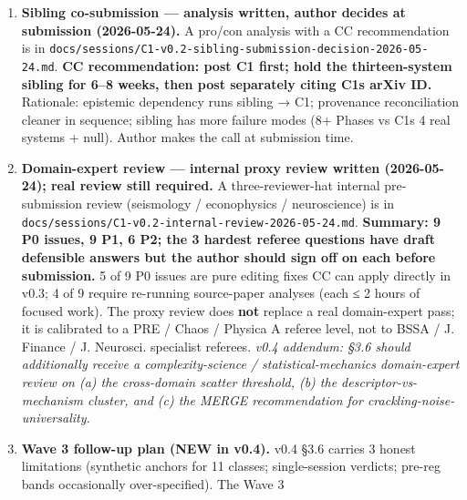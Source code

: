\documentclass[
  11pt]{article}
\begin{document}
\begin{enumerate}
  numerical one, (iii) reframing the §6.1 qualification in terms of
  which criterion is decisive for an SOC class claim (joint signature vs
  single Vuong test), (iv) adding an explicit falsifier statement for
  Phase 2\textquotesingle s SOC verdict, and (v) adding the historical
  lognormal-vs-power-law econophysics literature context. An
  econophysics-savvy domain expert should still review the framing
  before submission. A separate decision about whether to issue a
  published correction note for the standalone arxiv-02 paper is the
  author\textquotesingle s editorial call.
\item
  \textbf{Sibling co-submission --- analysis written, author decides at
  submission (2026-05-24).} A pro/con analysis with a CC recommendation
  is in
  \texttt{docs/sessions/C1-v0.2-sibling-submission-decision-2026-05-24.md}.
  \textbf{CC recommendation: post C1 first; hold the thirteen-system
  sibling for 6--8 weeks, then post separately citing
  C1\textquotesingle s arXiv ID.} Rationale: epistemic dependency runs
  sibling → C1; provenance reconciliation cleaner in sequence; sibling
  has more failure modes (8+ Phases vs C1\textquotesingle s 4 real
  systems + null). Author makes the call at submission time.
\item
  \textbf{Domain-expert review --- internal proxy review written
  (2026-05-24); real review still required.} A three-reviewer-hat
  internal pre-submission review (seismology / econophysics /
  neuroscience) is in
  \texttt{docs/sessions/C1-v0.2-internal-review-2026-05-24.md}.
  \textbf{Summary: 9 P0 issues, 9 P1, 6 P2; the 3 hardest referee
  questions have draft defensible answers but the author should sign off
  on each before submission.} 5 of 9 P0 issues are pure editing fixes CC
  can apply directly in v0.3; 4 of 9 require re-running source-paper
  analyses (each ≤ 2 hours of focused work). The proxy review does
  \textbf{not} replace a real domain-expert pass; it is calibrated to a
  PRE / Chaos / Physica A referee level, not to BSSA / J. Finance / J.
  Neurosci. specialist referees. \emph{v0.4 addendum: §3.6 should
  additionally receive a complexity-science / statistical-mechanics
  domain-expert review on (a) the cross-domain scatter threshold,
  (b) the descriptor-vs-mechanism cluster, and (c) the MERGE
  recommendation for crackling-noise-universality.}
\item
  \textbf{Wave 3 follow-up plan (NEW in v0.4).} v0.4 §3.6 carries 3
  honest limitations (synthetic anchors for 11 classes; single-session
  verdicts; pre-reg bands occasionally over-specified). The Wave 3

\end{enumerate}
\end{document}
